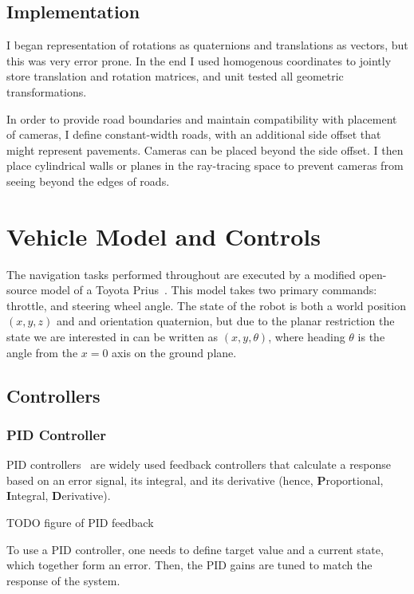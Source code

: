 \documentclass[a4paper,12pt,twoside,openright]{report}
\begin{document}
\subsection{Implementation}

I began representation of rotations as
quaternions and translations as vectors, but this was very error prone. 
In the end I used homogenous coordinates to jointly store translation
and rotation matrices, and unit tested all geometric transformations.

In order to provide road boundaries and 
maintain compatibility with placement of cameras, I define
constant-width roads, with an additional side offset that
might represent pavements. Cameras can be placed beyond the 
side offset. I then place cylindrical walls
or planes in the ray-tracing space to prevent cameras from
seeing beyond the edges of roads.


\section{Vehicle Model and Controls}
\label{sec:impl:vehicle}

The navigation tasks performed throughout are executed by a modified
open-source model of a Toyota Prius~\cite{osrfPrius}. This model
takes two primary commands: throttle, and steering wheel angle.
The state of the robot is both a world position $(x,y,z)$ and
and orientation quaternion, but due to the planar restriction
the state we are interested in can be written as
$(x,y, \theta)$, where heading $\theta$ is the angle from the $x=0$ axis 
on the ground plane.

\subsection{Controllers}

\subsubsection{PID Controller}
PID controllers~\cite{aastrom1995pid} are widely used feedback controllers
that calculate a response based on an error signal, its integral, and its derivative
(hence, \textbf{P}roportional, \textbf{I}ntegral, \textbf{D}erivative).

TODO figure of PID feedback

To use a PID controller, one needs to define target value and a current state,
which together form an error. Then, the PID gains are tuned to match
the response of the system.
\end{document}
